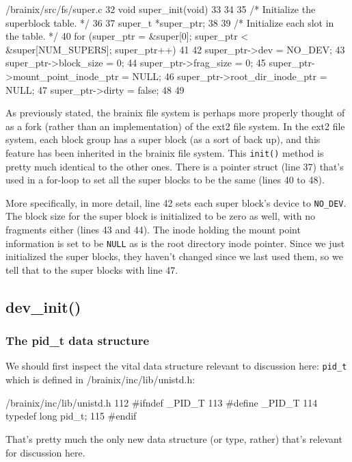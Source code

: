 \documentclass{article}
\begin{document}
\begin{code}{/brainix/src/fs/super.c}
32 void super_init(void)
33{
34
35 /* Initialize the superblock table. */
36
37      super_t *super_ptr;
38
39      /* Initialize each slot in the table. */
40      for (super_ptr = &super[0]; super_ptr < &super[NUM_SUPERS]; super_ptr++)
41      {
42           super_ptr->dev = NO_DEV;
43           super_ptr->block_size = 0;
44           super_ptr->frag_size = 0;
45           super_ptr->mount_point_inode_ptr = NULL;
46           super_ptr->root_dir_inode_ptr = NULL;
47           super_ptr->dirty = false;
48      }
49 }
\end{code}
As previously stated, the brainix file system is perhaps more properly thought of as a fork (rather than an implementation) of the ext2 file system. In the ext2 file system, each block group has a super block (as a sort of back up), and this feature has been inherited in the brainix file system. This \verb|init()| method is pretty much identical to the other ones. There is a pointer struct (line 37) that's used in a for-loop to set all the super blocks to be the same (lines 40 to 48).

More specifically, in more detail, line 42 sets each super block's device to \verb|NO_DEV|. The block size for the super block is initialized to be zero as well, with no fragments either (lines 43 and 44). The inode holding the mount point information is set to be \verb|NULL| as is the root directory inode pointer. Since we just initialized the super blocks, they haven't changed since we last used them, so we tell that to the super blocks with line 47.

\subsection{dev\_init()}

\subsubsection{The pid\_t data structure}

We should first inspect the vital data structure relevant to discussion here: \verb|pid_t| which is defined in /brainix/inc/lib/unistd.h:
\begin{code}{/brainix/inc/lib/unistd.h}
112 #ifndef _PID_T
113 #define _PID_T
114 typedef long pid_t;
115 #endif
\end{code}
That's pretty much the only new data structure (or type, rather) that's relevant for discussion here.
\end{document}
